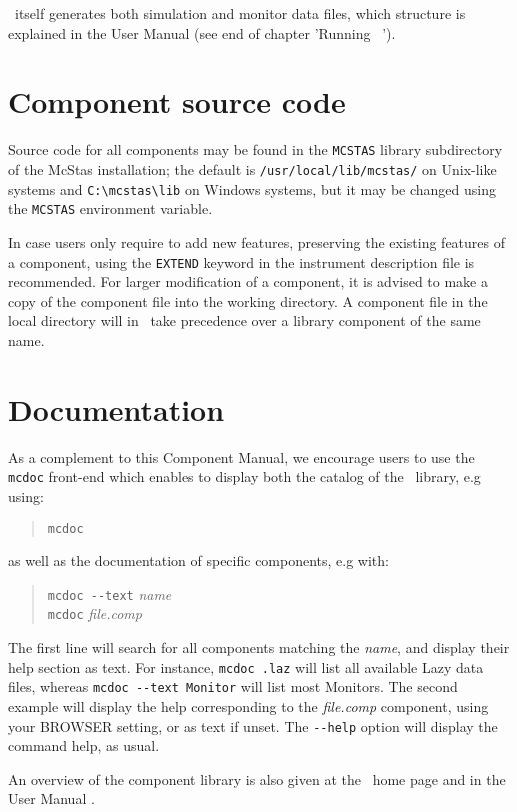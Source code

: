 \MCS\ itself generates both simulation and monitor data files, which structure is explained in the User Manual (see end of chapter 'Running \MCS\ ').

\section{Component source code}
Source code for all components may be found in the \verb+MCSTAS+ library
subdirectory of the McStas installation;
the default is \verb+/usr/local/lib/mcstas/+
on Unix-like systems and \verb+C:\mcstas\lib+ on Windows systems, but it may be
changed using the \verb+MCSTAS+ environment variable.

In case users only require to add new features, preserving the existing features of a component,
using the \verb+EXTEND+ keyword in the instrument description file is recommended. For larger modification of a component, it is advised to make a copy
of the component file into the working directory.
A component file in the local directory will in \MCS\ take precedence over
a library component of the same name.

\section{Documentation}
As a complement to this Component Manual, we encourage users to use
the \verb+mcdoc+ front-end which enables to display both the
catalog of the \MCS\ library, e.g using: 
\begin{quote}
  \verb|mcdoc|
\end{quote}
as well as the documentation of specific components, e.g with:
\begin{quote}
  \verb|mcdoc --text| {\it name} \\
  \verb|mcdoc| {\it file.comp}
\end{quote}
The first line will search for all components matching the {\it name},
and display their help section as text. For instance, \verb+mcdoc .laz+ will list all available Lazy data files, whereas \verb+mcdoc --text Monitor+ will list most Monitors.
The second example will display the help corresponding to
the {\it file.comp} component, using your
BROWSER setting, or as text if unset.
The \verb+--help+ option will display the command help, as usual.

An overview of the component library is also given at the \MCS\ home page \cite{mcstas_webpage} and in the User Manual \cite{mcstasmanual}.


